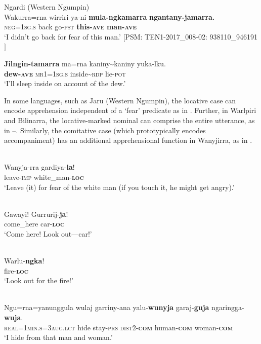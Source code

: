 \documentclass[output=paper,colorlinks,citecolor=brown]{langscibook}
\begin{document}
\ea
\textnormal{Ngardi (Western Ngumpin)}\\
\gll Wakurra=rna wirriri ya-ni \textbf{mula-ngkamarra} \textbf{ngantany-jamarra.} \\
\textsc{neg=1sg.s} back go-\textsc{pst} \textbf{this-\textsc{ave}} \textbf{man-\textsc{ave}} \\
\glt `I didn't go back for fear of this man.' $[$PSM: TEN1-2017\_008-02: 938110\_946191$]$
\label{ex:bro16}
\z

\ea
{} {\citealt{richards_interactive_2012}} 
\gll \textbf{Jilngin-tamarra} ma=rna kaniny\textasciitilde kaniny yuka-lku. \\
\textbf{dew-\textsc{ave}} \textsc{mr1=1sg.s} inside\textasciitilde \textsc{rdp} lie-\textsc{pot} \\
\glt `I'll sleep inside on account of the dew.' 
\label{ex:bro17}
\z

 In some languages, such as Jaru (Western Ngumpin), the locative case can encode apprehension independent of a `fear' predicate as in . Further, in Warlpiri and Bilinarra, the locative-marked nominal can comprise the entire utterance, as in --. Similarly, the comitative case (which prototypically encodes accompaniment) has an additional apprehensional function in Wanyjirra, as in .

\ea
{} {\citealt[58]{tsunoda_djaru_1981}} \\
\gll Wanyja-rra gardiya-\textbf{la}! \\
leave-\textsc{imp} white\_man-\textbf{\textsc{loc}} \\
\glt `Leave (it) for fear of the white man (if you touch it, he might get angry).' 
\label{ex:bro18}
\z

\ea
{} {\citealt[129]{meakins_grammar_2014}} \\
\gll Gawayi! Gurrurij-\textbf{ja}! \\
come\_here car-\textbf{\textsc{loc}}\\
\glt `Come here! Look out---car!'
\label{ex:bro19}
\z

\ea
{} \\
\gll Warlu-\textbf{ngka}! \\
fire-\textbf{\textsc{loc}} \\
\glt `Look out for the fire!'
\label{ex:bro20}
\z

\ea
{} {\citealt[200]{senge_grammar_2015}} \\
\gll Ngu=rna=yanunggula wulaj garriny-ana yalu-\textbf{wunyja} garaj-\textbf{guja} ngaringga-\textbf{wuja}. \\
\textsc{real=1min.s=3aug.lct} hide stay-\textsc{prs} \textsc{dist2-\textbf{com}} human-\textbf{\textsc{com}} woman-\textbf{\textsc{com}} \\
\glt `I hide from that man and woman.'
\label{ex:bro21}
\z
\end{document}
